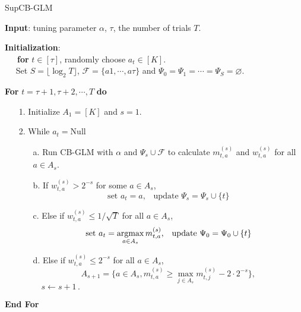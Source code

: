 \begin{algorithm}[h]
\caption{SupCB-GLM} \label{alg: SUPUCB}
\vspace{0.05in} \textbf{Input}: tuning parameter $\alpha$, $\tau$, the number of trials $T$.\vspace{0.05in}

\noindent\textbf{Initialization}: \\ \vspace{0.03in}
\indent\indent ~~~\textbf{for} $t\in[\tau]$, randomly choose $a_t \in [K]$. \\ \vspace{0.0in}
\indent\indent ~~ Set $S=\lfloor \log_2{T} \rfloor$, $\mathcal{F}=\{a1, \cdots, a{\tau}\}$ and $\Psi_0=\Psi_1=\cdots=\Psi_S=\varnothing$. \vspace{0.0in}

\textbf{For} {$t=\tau+1,\tau+2,\cdots,T$} \textbf{do}
 \begin{itemize}
 \item[1.] Initialize $A_1=[K]$ and $s=1$.
 \item[2.] While $a_t=$Null
    \begin{itemize}
    \item[a.] \vspace{-0.05in} Run CB-GLM with $\alpha$ and $\Psi_s \cup \mathcal{F}$ to calculate $m_{t,a}^{(s)}$ and $w_{t,a}^{(s)}$ for all $a \in A_s$.
    \item[b.] If $w_{t,a}^{(s)}>2^{-s}$ for some $a \in A_s$, $$ \textrm{set }  a_t=a \textrm{, ~~update } \Psi_s=\Psi_s \cup \{t\} $$
  \item[c.] Else if $w_{t,a}^{(s)} \le 1/\sqrt{T}$ for all $a \in A_s$, $$\textrm{set } a_t=\mathop{\rm argmax}_{a \in A_s} m_{t,a}^{(s)} \textrm{, ~~update }\Psi_0=\Psi_0 \cup \{t\} $$ 
  \vspace{-0.1in}  \item[d.] Else if $w_{t,a}^{(s)} \le 2^{-s}$ for all $a \in A_s$,
    $$A_{s+1}=\{a \in A_s, m_{t,a}^{(s)} \ge \max_{j \in A_s} m_{t,j}^{(s)} - 2 \cdot 2^{-s}\},$$
    $\quad s \leftarrow s+1\,.$
    \end{itemize}
 \end{itemize} \vspace{-0.05in}
\textbf{End For} \vspace{0.05in}
\end{algorithm}

